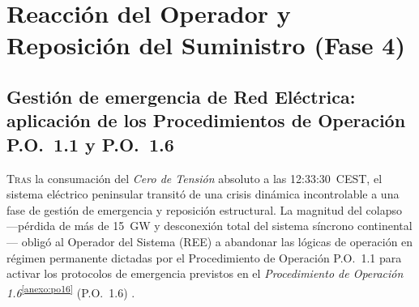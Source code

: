 
\chapter{Reacción del Operador y Reposición del Suministro (Fase 4)}
\label{cap:reaccion_reposicion}

\section{Gestión de emergencia de Red Eléctrica: aplicación de los Procedimientos de Operación P.O.~1.1 y P.O.~1.6}
\label{sec:gestion_emergencia}

\lettrine[lines=3, lhang=0.1]{T}{ras} la consumación del \textit{Cero de Tensión} absoluto a las 12:33:30~CEST,
el sistema eléctrico peninsular transitó de una crisis dinámica incontrolable
a una fase de gestión de emergencia y reposición estructural. La magnitud del
colapso ---pérdida de más de 15~GW y desconexión total del sistema síncrono
continental--- obligó al Operador del Sistema (REE) a abandonar las lógicas
de operación en régimen permanente dictadas por el Procedimiento de Operación
P.O.~1.1 para activar los protocolos de emergencia previstos en el
\textit{Procedimiento de Operación
1.6}\textsuperscript{\ref{anexo:po16}} (P.O.~1.6) \cite{entsoe2025}.

